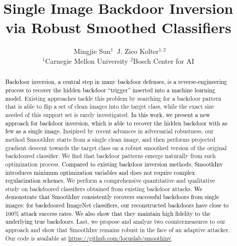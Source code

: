 \documentclass[10pt,twocolumn,letterpaper]{article}
\newcommand{\ms}[1]{\textcolor{black}{#1}}
\newcommand{\authorskip}{\hspace{4.5mm}}
\begin{document}
\title{
Single Image Backdoor Inversion via Robust Smoothed Classifiers
}

\author{\quad\, Mingjie Sun$^{1}$\authorskip\,  J. Zico Kolter$^{1,2}$\\
[2.mm]
$^1$Carnegie Mellon University \quad $^2$Bosch Center for AI\\
}
\maketitle
\begin{abstract}
\ms{Backdoor inversion, a central step in many backdoor defenses, is a reverse-engineering process to recover the hidden backdoor ``trigger'' inserted into a machine learning model.} Existing approaches tackle this problem by searching for a backdoor pattern that is able to flip a set of clean images into the target class, while the exact size needed of this support set is rarely investigated. \ms{In this work, we present a new approach for backdoor inversion, which is able to recover the hidden backdoor with as few as a single image.} Insipired by recent advances in adversarial robustness, our method SmoothInv starts from a single clean image, and then performs projected gradient descent towards the target class on a robust smoothed version of the original backdoored classifier. We find that backdoor patterns emerge naturally from such optimization process. \ms{Compared to existing backdoor inversion methods, SmoothInv introduces minimum optimization variables and does not require complex regularization schemes.} We perform a comprehensive quantitative and qualitative study on backdoored classifiers obtained from existing backdoor attacks. \ms{We demonstrate that SmoothInv consistently recovers successful backdoors from single images: for backdoored ImageNet classifiers, our reconstructed backdoors have close to 100\% attack success rates. We also show that they maintain  high fidelity to the underlying true backdoors.} 
Last, we propose and analyze two countermeasures to our approach and show that SmoothInv remains robust in the face of an adaptive attacker. Our code is available at \url{https://github.com/locuslab/smoothinv}.



\end{abstract}
\end{document}

